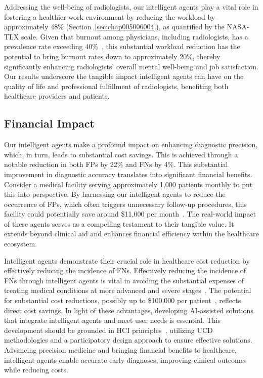 \textcolor{revised}{Addressing the well-being of radiologists, our intelligent agents play a vital role in fostering a healthier work environment by reducing the workload by approximately 48\% (Section~\ref{sec:chap005006004}), as quantified by the \ac{NASA-TLX} scale.
Given that burnout among physicians, including radiologists, has a prevalence rate exceeding 40\%~\cite{doi:10.1148/radiol.212631}, this substantial workload reduction has the potential to bring burnout rates down to approximately 20\%, thereby significantly enhancing radiologists' overall mental well-being and job satisfaction.
Our results underscore the tangible impact intelligent agents can have on the quality of life and professional fulfillment of radiologists, benefiting both healthcare providers and patients.}

\subsection{Financial Impact}
\label{sec:app005018004}

\textcolor{revised}{Our intelligent agents make a profound impact on enhancing diagnostic precision, which, in turn, leads to substantial cost savings.
This is achieved through a notable reduction in both \acp{FP} by 22\% and \acp{FN} by 4\%.
This substantial improvement in diagnostic accuracy translates into significant financial benefits.
Consider a medical facility serving approximately 1,000 patients monthly to put this into perspective.
By harnessing our intelligent agents to reduce the occurrence of \acp{FP}, which often triggers unnecessary follow-up procedures, this facility could potentially save around \$11,000 per month~\cite{10.1001/jamainternmed.2015.5231}.
The real-world impact of these agents serves as a compelling testament to their tangible value.
It extends beyond clinical aid and enhances financial efficiency within the healthcare ecosystem.}

\textcolor{revised}{Intelligent agents demonstrate their crucial role in healthcare cost reduction by effectively reducing the incidence of \acp{FN}.
Effectively reducing the incidence of \acp{FN} through intelligent agents is vital in avoiding the substantial expenses of treating medical conditions at more advanced and severe stages~\cite{DIN2022106073}.
The potential for substantial cost reductions, possibly up to \$100,000 per patient~\cite{McKinney2020}, reflects direct cost savings.
In light of these advantages, developing \acs{AI}-assisted solutions that integrate intelligent agents and meet user needs is essential.
This development should be grounded in \ac{HCI} principles~\cite{PELAU2021106855, 10.1145/3290605.3300233}, utilizing \ac{UCD} methodologies and a participatory design approach to ensure effective solutions.
Advancing precision medicine and bringing financial benefits to healthcare, intelligent agents enable accurate early diagnoses, improving clinical outcomes while reducing costs.}

